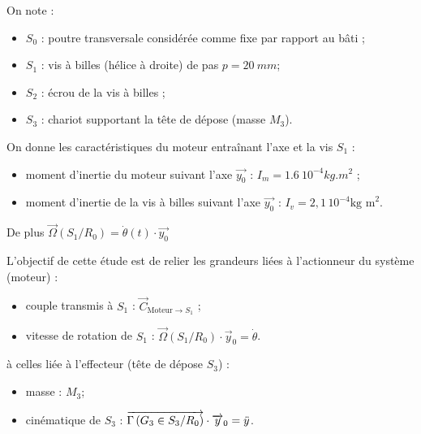 \documentclass[10pt,fleqn]{article} %
\begin{document}
\begin{multicols}{2}
\begin{multicols}{2}
On note : 
\begin{itemize}
\item $S_0$ : poutre transversale considérée comme fixe par rapport au bâti ;
\item $S_1$ : vis à billes (hélice à droite) de pas $p=\SI{20}{mm}$;
\item $S_2$ : écrou de la vis à billes ;
\item $S_3$ : chariot supportant la tête de dépose (masse $M_3$).
\end{itemize}


On donne les caractéristiques du moteur entraînant l'axe et la vis $S_1$ :
\begin{itemize}
\item moment d'inertie du moteur suivant l'axe $\overrightarrow{y_0}$ : $I_m = \SI{1,6}{10^{-4} kg.m^2}$ ;
\item moment d'inertie de la vis à billes suivant l'axe $\overrightarrow{y_0}$ : $I_v = 2,1\,  10^{-4}\text{kg m}^2$.
\end{itemize}
De plus $\overrightarrow{\Omega}(S_1/R_0)=\dot{\theta}(t)\cdot \overrightarrow{y_0}$


\begin{obj}
L'objectif de cette étude est de relier les grandeurs liées à l'actionneur du système (moteur) :
\begin{itemize}
\item couple transmis à $S_1$ : $\overrightarrow{C}_{\text{Moteur}\to S_1}$ ;
\item vitesse de rotation de $S_1$ : $\overrightarrow{\Omega}(S_1/R_0)\cdot \overrightarrow{y}_0=\dot{\theta}$.
\end{itemize} 
à celles liée à l'effecteur (tête de dépose $S_3$) : 
\begin{itemize}
\item masse : $M_3$;
\item cinématique de $S_3$ : $\overrightarrow{\Gamma \left( {G_3} \in {S_3}/{R_0}\right)}\cdot \overrightarrow{y}_0=\ddot{y}$.
\end{itemize}
\end{obj}






\end{multicols}
\end{multicols}
\end{document}
